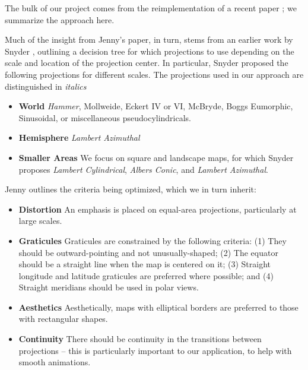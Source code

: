 The bulk of our project comes from the reimplementation of a recent paper
  \cite{key:2012jenny-maps}; we summarize the approach here.

Much of the insight from Jenny's paper, in turn, stems from an earlier work
  by Snyder \cite{key:1987snyder-maps}, outlining a decision tree for which
  projections to use depending on the scale and location of the projection
  center.
In particular, Snyder proposed the following projections for different scales.
The projections used in our approach are distinguished in \textit{italics}

\begin{itemize}
  \item \textbf{World} \textit{Hammer}, Mollweide, Eckert IV or VI,
        McBryde, Boggs Eumorphic, Sinusoidal, or miscellaneous pseudocylindricals.
  \item \textbf{Hemisphere} \textit{Lambert Azimuthal}
  \item \textbf{Smaller Areas} We focus on square and landscape maps, for which
        Snyder proposes \textit{Lambert Cylindrical}, \textit{Albers Conic},
        and \textit{Lambert Azimuthal}.
\end{itemize}

Jenny outlines the criteria being optimized, which we in turn inherit:

\begin{itemize}
  \item \textbf{Distortion} An emphasis is placed on equal-area projections,
        particularly at large scales.
  \item \textbf{Graticules} Graticules are constrained by the
        following criteria:
        (1) They should be outward-pointing and not unusually-shaped;
        (2) The equator should be a straight line when the map is centered on it;
        (3) Straight longitude and latitude graticules are preferred where possible;
        and
        (4) Straight meridians should be used in polar views.
  \item \textbf{Aesthetics} Aesthetically, maps with elliptical borders are
        preferred to those with rectangular shapes.
  \item \textbf{Continuity} There should be continuity in the transitions
        between projections -- this is particularly important to our application,
        to help with smooth animations.
\end{itemize}


